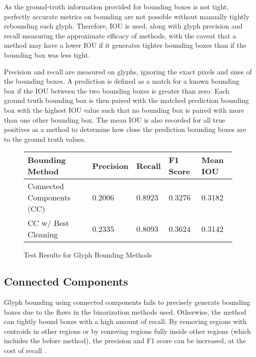 As the ground-truth information provided for bounding boxes is not tight, perfectly accurate metrics on bounding are not possible without manually tightly rebounding each glyph. Therefore, IOU is used, along with glyph precision and recall measuring the approximate efficacy of methods, with the caveat that a method may have a lower IOU if it generates tighter bounding boxes than if the bounding box was less tight.

Precision and recall are measured on glyphs, ignoring the exact pixels and sizes of the bounding boxes. A prediction is defined as a match for a known bounding box if the IOU between the two bounding boxes is greater than zero. Each ground truth bounding box is then paired with the matched prediction bounding box with the highest IOU value such that no bounding box is paired with more than one other bounding box. The mean IOU is also recorded for all true positives as a method to determine how close the prediction bounding boxes are to the ground truth values.

\begin{figure}[H]
    \caption{Test Results for Glyph Bounding Methods}
    \label{fig:boundingEval}
    \centering
    \begin{tabular}{ | l | l | l | l | l | }
        \hline
        Bounding Method & Precision & Recall & F1 Score & Mean IOU \\
        \hline
        Connected Components (CC) & 0.2006 & 0.8923 & 0.3276 & 0.3182 \\
        CC w/ Best Cleaning & 0.2335 & 0.8093 & 0.3624 & 0.3142 \\
        \hline
    \end{tabular}
\end{figure}

\subsection{Connected Components}

Glyph bounding using connected components fails to precisely generate bounding boxes due to the flaws in the binarization methods used. Otherwise, the method can tightly bound boxes with a high amount of recall. By removing regions with centroids in other regions or by removing regions fully inside other regions (which includes the before method), the precision and F1 score can be increased, at the cost of recall .


